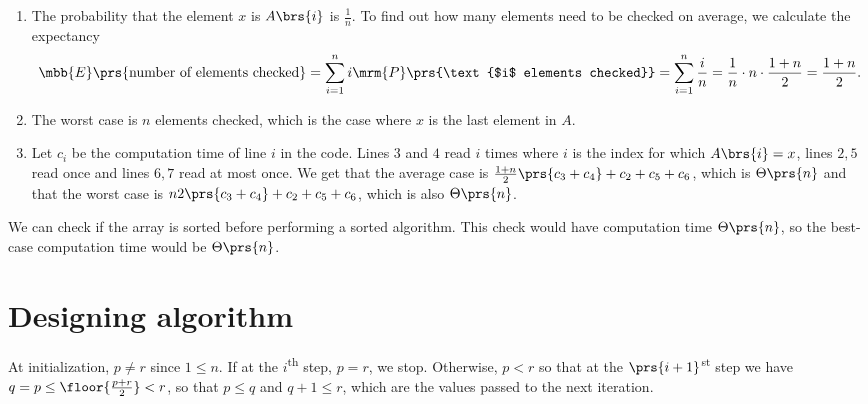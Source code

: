\documentclass[oneside]{scrbook}
\theoremstyle{definition}
\begin{document}
\begin{exercise}
    \begin{enumerate}
    \item The probability that the element $x$ is $A\brs{i}$ is $\frac{1}{n}$. To find out how many elements need to be checked on average, we calculate the expectancy
    \[\mbb{E}\prs{\text{number of elements checked}} = \sum_{i = 1}^n i \mrm{P}\prs{\text{$i$ elements checked}} = \sum_{i=1}^n \frac{i}{n} = \frac{1}{n} \cdot n \cdot \frac{1+n}{2} = \frac{1+n}{2} \text{.}\]
    \item The worst case is $n$ elements checked, which is the case where $x$ is the last element in $A$.
    \item Let $c_i$ be the computation time of line $i$ in the code. Lines $3$ and $4$ read $i$ times where $i$ is the index for which $A\brs{i} = x$, lines $2, 5$ read once and lines $6,7$ read at most once. We get that the average case is $\frac{1+n}{2}\prs{c_3 + c_4} + c_2 + c_5 + c_6$, which is $\Theta\prs{n}$ and that the worst case is $n{2}\prs{c_3 + c_4} + c_2 + c_5 + c_6$, which is also $\Theta\prs{n}$.
    \end{enumerate}
\end{exercise}

\begin{exercise}
    We can check if the array is sorted before performing a sorted algorithm. This check would have computation time $\Theta\prs{n}$, so the best-case computation time would be $\Theta\prs{n}$.
\end{exercise}

\section{Designing algorithm}

\begin{exercise}
\end{exercise}

\begin{exercise}
    At initialization, $p \neq r$ since $1 \leq n$. If at the $i$\textsuperscript{th} step, $p = r$, we stop. Otherwise, $p < r$ so that at the $\prs{i+1}$\textsuperscript{st} step we have $q = p \leq \floor{\frac{p + r}{2}} < r$, so that $p \leq q$ and $q+1 \leq r$, which are the values passed to the next iteration.
\end{exercise}
\end{document}
